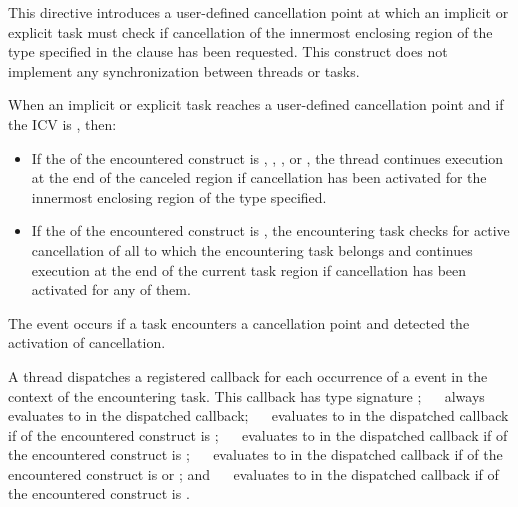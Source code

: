 \descr
This directive introduces a user-defined cancellation point at which an implicit or
explicit task must check if cancellation of the innermost enclosing region of the type
specified in the clause has been requested. This construct does not implement any
synchronization between threads or tasks.

When an implicit or explicit task reaches a user-defined cancellation point and if
the  ICV is , then:

\begin{itemize}
\item If the  of the encountered  
      construct is , , , or ,
      the thread continues execution at the end of the canceled region if
      cancellation has been activated for the innermost enclosing region of
      the type specified.
\item If the  of the encountered
       construct is , the encountering
      task checks for active cancellation of all   to which the
      encountering task belongs and continues execution at the end of the current
      task region if cancellation has been activated for any of them.
\end{itemize}

\events

The  event occurs if a task encounters a
cancellation point and detected the activation of cancellation.

\tools

A thread dispatches a registered  callback 
for each occurrence of a  event in the context of the encountering 
task. This callback has type signature ; 
\code{(}~\code{&}~ always evaluates 
to  in the dispatched callback; 
\code{(}~\code{&}~ evaluates to 
 in the dispatched callback if  of 
the encountered  construct is ; 
\code{(}~\code{&}~ evaluates to 
 in the dispatched callback if  of 
the encountered  construct is ; 
\code{(}~\code{&}~ evaluates to 
 in the dispatched callback if  of 
the encountered  construct is  or 
; and
\code{(}~\code{&}~ evaluates to 
 in the dispatched callback if  of 
the encountered  construct is .

